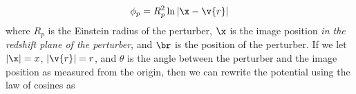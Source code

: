 \begin{equation}
\phi_p = R_p^2 \ln \left| \x - \v{r} \right| 
\end{equation}
where $R_p$ is the Einstein radius of the perturber, $\x$ is the image position \textit{in the redshift plane of the perturber}, and $\br$ is the position of the perturber. If we let $|\x| = x$, $|\v{r}| = r$, and $\theta$ is the angle between the perturber and the image position as measured from the origin, then we can rewrite the potential using the law of cosines as
  